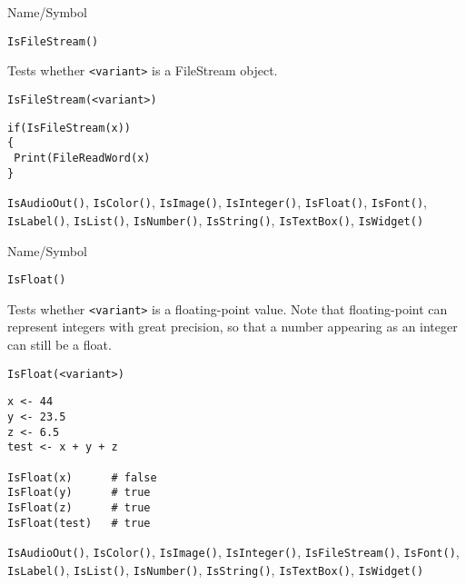\rl




\begin{desc}{Name/Symbol}
\item[Name/Symbol]	\verb+IsFileStream()+

\item[Description]	Tests whether \verb+<variant>+ is a FileStream object.

\item[Usage]		
\begin{verbatim}
IsFileStream(<variant>)
\end{verbatim}

\item[Example]
\begin{verbatim}
if(IsFileStream(x))
{
 Print(FileReadWord(x)
}
\end{verbatim}

\item[See Also] \verb+IsAudioOut()+, \verb+IsColor()+,
  \verb+IsImage()+, \verb+IsInteger()+, \verb+IsFloat()+,
  \verb+IsFont()+, \verb+IsLabel()+, \verb+IsList()+,
  \verb+IsNumber()+, \verb+IsString()+, \verb+IsTextBox()+,
  \verb+IsWidget()+
\end{desc}

\rl




\begin{desc}{Name/Symbol}
\item[Name/Symbol]	\verb+IsFloat()+

\item[Description] Tests whether \verb+<variant>+ is a floating-point
  value. Note that floating-point can represent integers with great
  precision, so that a number appearing as an integer can still be a
  float.

\item[Usage]
\begin{verbatim}
IsFloat(<variant>)
\end{verbatim}

\item[Example]
\begin{verbatim}
x <- 44
y <- 23.5
z <- 6.5
test <- x + y + z 

IsFloat(x)     	# false
IsFloat(y)     	# true
IsFloat(z)     	# true
IsFloat(test)  	# true
\end{verbatim}

\item[See Also] \verb+IsAudioOut()+, \verb+IsColor()+,
  \verb+IsImage()+, \verb+IsInteger()+, \verb+IsFileStream()+,
  \verb+IsFont()+, \verb+IsLabel()+, \verb+IsList()+,
  \verb+IsNumber()+, \verb+IsString()+, \verb+IsTextBox()+,
  \verb+IsWidget()+
\end{desc}

